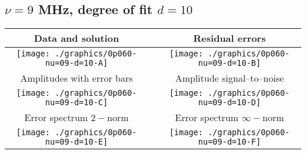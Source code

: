 

% 

\clearpage{}
\break{}

\subsection{$\nu = 9$ MHz, degree of fit $d = 10$}

\begin{table}[h]
    \begin{center}
        \begin{tabular}{ccc}
            Data and solution & \quad & Residual errors \\\hline
            \texttt{[image: ./graphics/0p060-nu=09-d=10-A]} &&
            \texttt{[image: ./graphics/0p060-nu=09-d=10-B]} \\[15pt]
            Amplitudes with error bars && Amplitude signal--to--noise \\\hline
            \texttt{[image: ./graphics/0p060-nu=09-d=10-C]} &&
            \texttt{[image: ./graphics/0p060-nu=09-d=10-D]} \\[15pt]
            Error spectrum $2-$norm && Error spectrum $\infty-$norm \\\hline
            \texttt{[image: ./graphics/0p060-nu=09-d=10-E]} &&
            \texttt{[image: ./graphics/0p060-nu=09-d=10-F]} \\[15pt]
        \end{tabular}
    \end{center}
\label{fig:elev=60, nu=9}
\end{table}



\endinput
